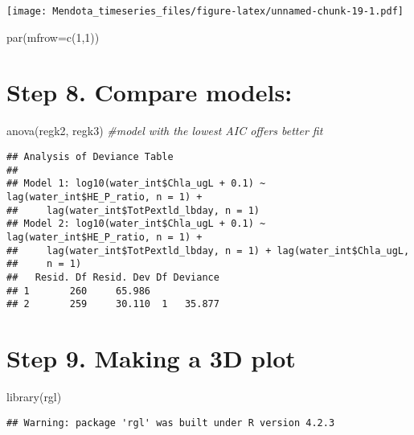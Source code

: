 \documentclass[
]{article}
\newenvironment{Shaded}{\begin{snugshade}}{\end{snugshade}}
\newcommand{\AttributeTok}[1]{\textcolor[rgb]{0.77,0.63,0.00}{#1}}
\newcommand{\CommentTok}[1]{\textcolor[rgb]{0.56,0.35,0.01}{\textit{#1}}}
\newcommand{\DecValTok}[1]{\textcolor[rgb]{0.00,0.00,0.81}{#1}}
\newcommand{\FunctionTok}[1]{\textcolor[rgb]{0.00,0.00,0.00}{#1}}
\newcommand{\NormalTok}[1]{#1}
\begin{document}
\texttt{[image: Mendota\_timeseries\_files/figure-latex/unnamed-chunk-19-1.pdf]}

\begin{Shaded}
\begin{Highlighting}[]
\FunctionTok{par}\NormalTok{(}\AttributeTok{mfrow=}\FunctionTok{c}\NormalTok{(}\DecValTok{1}\NormalTok{,}\DecValTok{1}\NormalTok{))}
\end{Highlighting}
\end{Shaded}

\hypertarget{step-8.-compare-models}{%
\section{Step 8. Compare models:}\label{step-8.-compare-models}}

\begin{Shaded}
\begin{Highlighting}[]
\FunctionTok{anova}\NormalTok{(regk2, regk3) }\CommentTok{\#model with the lowest AIC offers better fit}
\end{Highlighting}
\end{Shaded}

\begin{verbatim}
## Analysis of Deviance Table
## 
## Model 1: log10(water_int$Chla_ugL + 0.1) ~ lag(water_int$HE_P_ratio, n = 1) + 
##     lag(water_int$TotPextld_lbday, n = 1)
## Model 2: log10(water_int$Chla_ugL + 0.1) ~ lag(water_int$HE_P_ratio, n = 1) + 
##     lag(water_int$TotPextld_lbday, n = 1) + lag(water_int$Chla_ugL, 
##     n = 1)
##   Resid. Df Resid. Dev Df Deviance
## 1       260     65.986            
## 2       259     30.110  1   35.877
\end{verbatim}

\hypertarget{step-9.-making-a-3d-plot}{%
\section{Step 9. Making a 3D plot}\label{step-9.-making-a-3d-plot}}

\begin{Shaded}
\begin{Highlighting}[]
\FunctionTok{library}\NormalTok{(rgl)}
\end{Highlighting}
\end{Shaded}

\begin{verbatim}
## Warning: package 'rgl' was built under R version 4.2.3
\end{verbatim}
\end{document}
